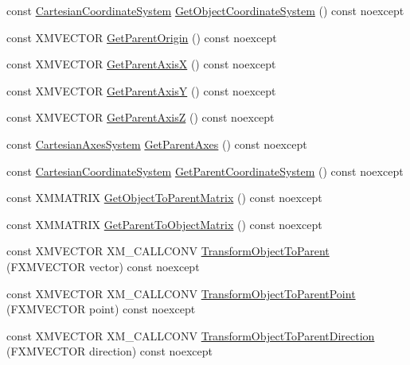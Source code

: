 \begin{DoxyCompactItemize}
const \hyperlink{structmage_1_1_cartesian_coordinate_system}{Cartesian\+Coordinate\+System} \hyperlink{classmage_1_1_transform_a051432f12292cd6c46ec2483eca87d86}{Get\+Object\+Coordinate\+System} () const noexcept
\item 
const X\+M\+V\+E\+C\+T\+OR \hyperlink{classmage_1_1_transform_ac15f904c1b365583513a8827c483ff21}{Get\+Parent\+Origin} () const noexcept
\item 
const X\+M\+V\+E\+C\+T\+OR \hyperlink{classmage_1_1_transform_a552e7b9e654d57e6ba6281eaa6d25ca2}{Get\+Parent\+AxisX} () const noexcept
\item 
const X\+M\+V\+E\+C\+T\+OR \hyperlink{classmage_1_1_transform_a594483a22316fa35cac46e6e4d10ec3b}{Get\+Parent\+AxisY} () const noexcept
\item 
const X\+M\+V\+E\+C\+T\+OR \hyperlink{classmage_1_1_transform_a1661099c0f983c32c1145f970d039d0b}{Get\+Parent\+AxisZ} () const noexcept
\item 
const \hyperlink{structmage_1_1_cartesian_axes_system}{Cartesian\+Axes\+System} \hyperlink{classmage_1_1_transform_aad9c46d73c7afd7412a65fe5381ae4b6}{Get\+Parent\+Axes} () const noexcept
\item 
const \hyperlink{structmage_1_1_cartesian_coordinate_system}{Cartesian\+Coordinate\+System} \hyperlink{classmage_1_1_transform_a45b460585620b4b3e9ae20437ba1ef71}{Get\+Parent\+Coordinate\+System} () const noexcept
\item 
const X\+M\+M\+A\+T\+R\+IX \hyperlink{classmage_1_1_transform_a1171e7ebcdaea6329871a3c8946dbfe6}{Get\+Object\+To\+Parent\+Matrix} () const noexcept
\item 
const X\+M\+M\+A\+T\+R\+IX \hyperlink{classmage_1_1_transform_afbe8535cd6616d92d1107c6baff78125}{Get\+Parent\+To\+Object\+Matrix} () const noexcept
\item 
const X\+M\+V\+E\+C\+T\+OR X\+M\+\_\+\+C\+A\+L\+L\+C\+O\+NV \hyperlink{classmage_1_1_transform_a622f8234d70768c33a3cbb8fa50932cc}{Transform\+Object\+To\+Parent} (F\+X\+M\+V\+E\+C\+T\+OR vector) const noexcept
\item 
const X\+M\+V\+E\+C\+T\+OR X\+M\+\_\+\+C\+A\+L\+L\+C\+O\+NV \hyperlink{classmage_1_1_transform_a2d93dac4ae0b5b2723d2fbce077da85f}{Transform\+Object\+To\+Parent\+Point} (F\+X\+M\+V\+E\+C\+T\+OR point) const noexcept
\item 
const X\+M\+V\+E\+C\+T\+OR X\+M\+\_\+\+C\+A\+L\+L\+C\+O\+NV \hyperlink{classmage_1_1_transform_afddbd41527257bf0ed20ceafa19b49c9}{Transform\+Object\+To\+Parent\+Direction} (F\+X\+M\+V\+E\+C\+T\+OR direction) const noexcept

\end{DoxyCompactItemize}
